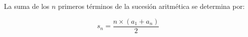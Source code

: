 La suma de los $n$ primeros términos de la sucesión aritmética se determina por:

$$ s_n = \frac{n\times (a_1+a_n)}{2} $$